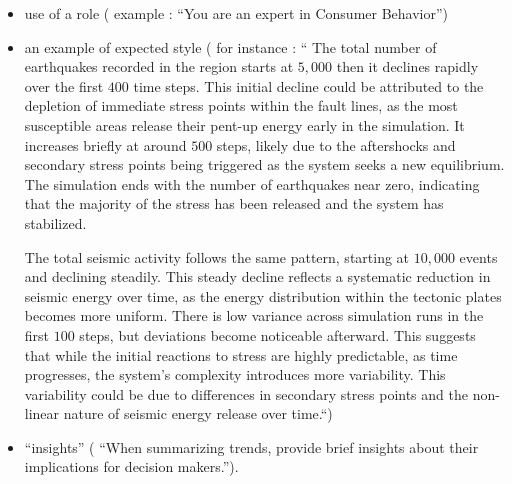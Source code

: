\documentclass[preprint,12pt]{elsarticle}
\begin{document}
\begin{itemize}
    \item use of a role ( example : “You are an expert in Consumer Behavior”)
    \item an example of expected style ( for instance : “ The total number of earthquakes recorded in the region starts at $5,000$ then it declines rapidly over the first $400$ time steps. This initial decline could be attributed to the depletion of immediate stress points within the fault lines, as the most susceptible areas release their pent-up energy early in the simulation. It increases briefly at around $500$ steps, likely due to the aftershocks and secondary stress points being triggered as the system seeks a new equilibrium. The simulation ends with the number of earthquakes near zero, indicating that the majority of the stress has been released and the system has stabilized.

    The total seismic activity follows the same pattern, starting at $10,000$ events and declining steadily. This steady decline reflects a systematic reduction in seismic energy over time, as the energy distribution within the tectonic plates becomes more uniform. There is low variance across simulation runs in the first $100$ steps, but deviations become noticeable afterward. This suggests that while the initial reactions to stress are highly predictable, as time progresses, the system's complexity introduces more variability. This variability could be due to differences in secondary stress points and the non-linear nature of seismic energy release over time.“) 
    \item “insights” ( “When summarizing trends, provide brief insights about their implications for decision makers.”). 
\end{itemize}
\end{document}
